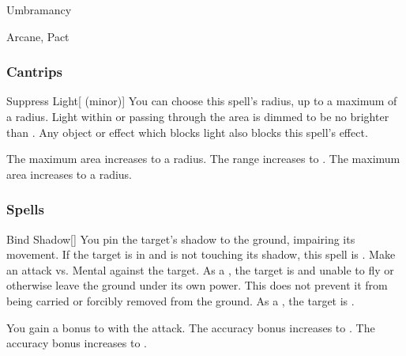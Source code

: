 \newpage
\begin{spellsection}{Umbramancy}

\begin{spellheader}
\end{spellheader}


 Arcane, Pact

\subsubsection{Cantrips}


\begin{freeability}{Suppress Light}[ (minor)]
You can choose this spell's radius, up to a maximum of a \areamed radius.
Light within or passing through the area is dimmed to be no brighter than .
Any object or effect which blocks light also blocks this spell's effect.

\rankline
{} The maximum area increases to a \arealarge radius.
 The range increases to \rnglong.
 The maximum area increases to a \areaext radius.
\end{freeability}

\end{spellsection}


\subsubsection{Spells}


\lowercase{\hypertarget{spell:Bind Shadow}{}}\label{spell:Bind Shadow}
\begin{freeability}[Rank 1]{\hypertarget{spell:Bind Shadow}{Bind Shadow}}[]
You pin the target's shadow to the ground, impairing its movement.
If the target is in  and is not touching its shadow, this spell is .
Make an attack vs. Mental against the target.
\hit As a , the target is  and unable to fly or otherwise leave the ground under its own power.
This does not prevent it from being carried or forcibly removed from the ground.
\crit As a , the target is .

\rankline
{} You gain a  bonus to  with the attack.
 The accuracy bonus increases to .
 The accuracy bonus increases to .
\end{freeability}
\vspace{0.25em}



